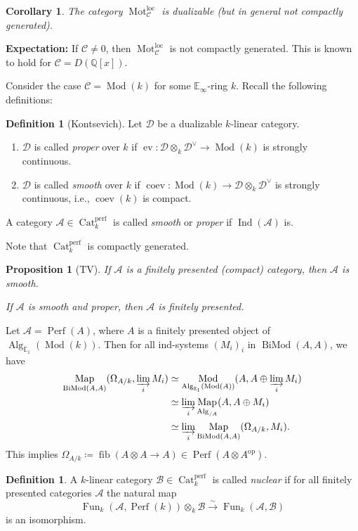 \documentclass[draft]{amsart}
\newcommand{\QQ}{\mathbb{Q}}
\newcommand{\EE}{\mathbb{E}}
\newcommand{\cat}[1]{\mathcal{#1}}
\newcommand{\op}{\mathrm{op}}
\newcommand{\isoto}{\mathbin{\xrightarrow{\sim}}}
\DeclareMathOperator{\fib}{fib}
\DeclareMathOperator{\Ind}{Ind}
\DeclareMathOperator{\Map}{Map}
\DeclareMathOperator{\Cat}{Cat}
\DeclareMathOperator{\Fun}{Fun}
\DeclareMathOperator{\Mod}{Mod}
\DeclareMathOperator{\Perf}{Perf}
\DeclareMathOperator{\BiMod}{BiMod}
\DeclareMathOperator{\Alg}{Alg}
\DeclareMathOperator{\coev}{coev}
\DeclareMathOperator{\ev}{ev}
\DeclareMathOperator{\Mot}{Mot}
\newtheorem{prop}[thm]{Proposition}
\newtheorem{cor}[thm]{Corollary}
\theoremstyle{definition}
\newtheorem{defn}[thm]{Definition}
\begin{document}
\begin{cor}
The category $\Mot_{\cat C}^{\mathrm{loc}}$ is dualizable (but in general not compactly generated).
\end{cor}

\textbf{Expectation:} If $\cat C\neq 0$, then $\Mot_{\cat C}^{\mathrm{loc}}$ is not compactly generated. This is known to hold for $\cat C = D(\QQ[x])$.
\bigskip

Consider the case $\cat C = \Mod(k)$ for some $\EE_\infty$-ring $k$. Recall the following definitions:
\begin{defn}[Kontsevich]
Let $\cat D$ be a dualizable $k$-linear category.
\begin{enumerate}[(1)]
\item $\cat D$ is called \emph{proper} over $k$ if $\ev\colon \cat D\otimes_k \cat D^\vee \to \Mod(k)$ is strongly continuous.

\item $\cat D$ is called \emph{smooth} over $k$ if $\coev\colon \Mod(k)\to \cat D\otimes_k \cat D^\vee$ is strongly continuous, i.e., $\coev(k)$ is compact.
\end{enumerate}

A category $\cat A \in \Cat^{\mathrm{perf}}_k$ is called \emph{smooth} or \emph{proper} if $\Ind(\cat A)$ is.
\end{defn}

Note that $\Cat^{\mathrm{perf}}_k$ is compactly generated.

\begin{prop}[TV]
If $\cat A$ is a finitely presented (compact) category, then $\cat A$ is smooth.

If $\cat A$ is smooth and proper, then $\cat A$ is finitely presented.
\end{prop}

Let $\cat A = \Perf(A)$, where $A$ is a finitely presented object of $\Alg_{\EE_1}(\Mod(k))$. Then for all ind-systems $(M_i)_i$ in $\BiMod(A,A)$, we have
\begin{align*}
\Map_{\BiMod(A,A)}(\Omega_{A/k}, \varinjlim_i M_i) &\simeq 
\Mod_{\Alg_{\EE_1}(\Mod(A))}(A, A\oplus \varinjlim_i M_i) \\
&\simeq \varinjlim_i \Map_{\Alg_{/A}}(A, A\oplus M_i) \\
&\simeq \varinjlim_i \Map_{\BiMod(A,A)}(\Omega_{A/k}, M_i).
\end{align*}
This implies $\Omega_{A/k} \coloneqq \fib(A\otimes A\to A) \in \Perf(A\otimes A^\op)$.

\begin{defn}
A $k$-linear category $\cat B \in \Cat_k^{\mathrm{perf}}$ is called \emph{nuclear} if for all finitely presented categories $\cat A$ the natural map
\[
\Fun_k(\cat A, \Perf(k))\otimes_k \cat B \isoto \Fun_k(\cat A,\cat B)
\]
is an isomorphism.
\end{defn}
\end{document}
